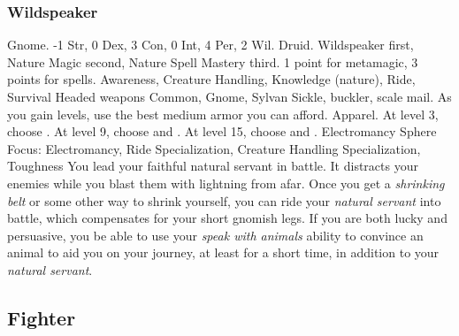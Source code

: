         \subsubsection{Wildspeaker}
             Gnome.
             -1 Str, 0 Dex, 3 Con, 0 Int, 4 Per, 2 Wil.
             Druid.
             Wildspeaker first, Nature Magic second, Nature Spell Mastery third.
             1 point for metamagic, 3 points for spells.
             Awareness, Creature Handling, Knowledge (nature), Ride, Survival
             Headed weapons
             Common, Gnome, Sylvan
             Sickle, buckler, scale mail. As you gain levels, use the best medium armor you can afford.
             Apparel.
                At level 3, choose .
                At level 9, choose  and .
                At level 15, choose  and .
             Electromancy
             Sphere Focus: Electromancy, Ride Specialization, Creature Handling Specialization, Toughness
             You lead your faithful natural servant in battle.
            It distracts your enemies while you blast them with lightning from afar.
            Once you get a \textit{shrinking belt} or some other way to shrink yourself, you can ride your \textit{natural servant} into battle, which compensates for your short gnomish legs.
            If you are both lucky and persuasive, you be able to use your \textit{speak with animals} ability to convince an animal to aid you on your journey, at least for a short time, in addition to your \textit{natural servant}.

    \subsection{Fighter}

